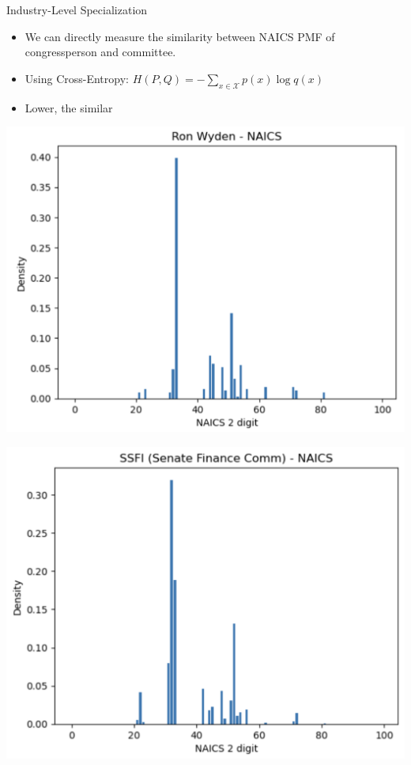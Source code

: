 \documentclass{beamer}
\begin{document}
	\begin{frame}{Industry-Level Specialization}
		\begin{itemize}
			\item We can directly measure the similarity between NAICS PMF of congressperson and committee.
			\item Using Cross-Entropy: $H(P, Q)=-\sum_{x \in \mathcal{X}} p(x) \log q(x)$
			\item Lower, the similar
		\end{itemize}
		\begin{center}
			\begin{minipage}{0.3\textwidth}
				\centering
				\includegraphics[scale=0.15]{./images/r.png} %
			\end{minipage}
			\hfill
			\begin{minipage}{0.3\textwidth}
				\centering
				\includegraphics[scale=0.15]{./images/ssfi.png} %

\end{minipage}
\end{center}
\end{frame}
\end{document}
